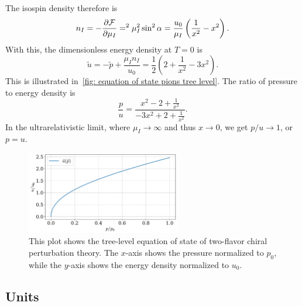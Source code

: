 The isospin density therefore is
%
\begin{equation}
    n_I = -\pdv{\mathcal{F}}{\mu_I} = ^2 \mu_I^2 \sin^2 \alpha 
    = 
    \frac{u_0}{\mu_I} \left(\frac{1}{x^2} - x^2\right).
\end{equation}
%
With this, the dimensionless energy density at $T = 0$ is
%
\begin{equation}
    \tilde u = - \tilde p + \frac{\mu_I n_I}{u_0}
    = \frac{1}{2} \left( 2 + \frac{1}{x^2} - 3 x^2\right).
\end{equation}
%
This is illustrated in~\autoref{fig: equation of state pions tree level}.
The ratio of pressure to energy density is
%
\begin{equation}
    \frac{p}{u} = \frac{x^2 - 2 + \frac{1}{x^2}}{-3x^2 + 2 + \frac{1}{x^2}}.
\end{equation}
%
In the ultrarelativistic limit, where $\mu_I \rightarrow \infty$ and thus $x \rightarrow 0$, we get $p / u \rightarrow 1$, or $p = u$.



\begin{figure}[h]
    \centering
    \includegraphics[width=0.6\textwidth]{../scripts/figurer/pion_tree_eos.pdf}
    \caption{
        This plot shows the tree-level equation of state of two-flavor chiral perturbation theory. The $x$-axis shows the pressure normalized to $p_0$, while the $y$-axis shows the energy density normalized to $u_0$.
    }
    \label{fig: equation of state pions tree level}
\end{figure}


\subsection{Units}


